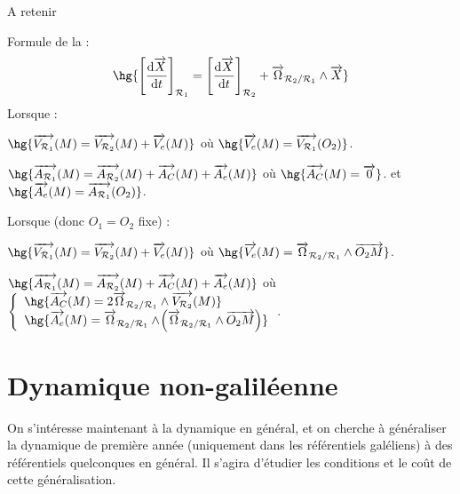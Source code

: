 \documentclass[a4paper,french,bookmarks]{book}
\begin{document}
    \begin{form}{A retenir}{}
        \begin{enumerate}
            \itt Formule de la  :
            \[ \hg{\intc{\dfrac{\dif \vec X}{\dif t}}_{\bcR_1} = \intc{\dfrac{\dif \vec X}{\dif t}}_{\bcR_2} + \vec \Omega_{\bcR_2 / \bcR_1} \wedge \vec{ X}}\]
            \itt Lorsque  :
            \begin{enumerate}
                \itast $\hg{\vec{V_{\bcR_1}}\p{M} = \vec{V_{\bcR_2}}\p{M} + \vec{V_e}\p{M}}$ où $\hg{\vec{V_e}\p{M} = \vec{V_{\bcR_1}}\p{O_2}}$.
                
                \itast $\hg{\vec{A_{\bcR_1}}\p{M} = \vec{A_{\bcR_2}}\p{M} + \vec{A_C}\p{M} + \vec{A_e}\p{M}}$ où $\hg{\vec{A_C}\p{M} = \vec 0}$. et $\hg{\vec{A_e}\p{M} = \vec{A_{\bcR_1}}\p{O_2}}$.
            \end{enumerate}
            
            \itt Lorsque  (donc $O_1 = O_2$ fixe) :
            \begin{enumerate}
                \itast $\hg{\vec{V_{\bcR_1}}\p{M} = \vec{V_{\bcR_2}}\p{M} + \vec{V_e}\p{M}}$ où $\hg{\vec{V_e}\p{M} = \vec\Omega_{\bcR_2/\bcR_1} \wedge \vec{O_2M}}$.
                
                \itast $\hg{\vec{A_{\bcR_1}}\p{M} = \vec{A_{\bcR_2}}\p{M} + \vec{A_C}\p{M} + \vec{A_e}\p{M}}$ où $\left\lbrace\begin{array}{l}
                    \hg{\vec{A_C}\p{M} = 2\vec\Omega_{\bcR_2/\bcR_1} \wedge \vec{V_{\bcR_2}}\p{M}} \\
                    \hg{\vec{A_e}\p{M} = \vec\Omega_{\bcR_2/\bcR_1} \wedge \p{\vec\Omega_{\bcR_2/\bcR_1} \wedge \vec{O_2M}}}
                \end{array}\right. $.
            \end{enumerate}
        \end{enumerate}
    
    \end{form}
        
    \section{Dynamique non-galiléenne}
    
    On s'intéresse maintenant à la dynamique en général, et on cherche à généraliser la dynamique de première année (uniquement dans les référentiels galéliens) à des référentiels quelconques en général. Il s'agira d'étudier les conditions et le coût de cette généralisation.
    
\end{document}
